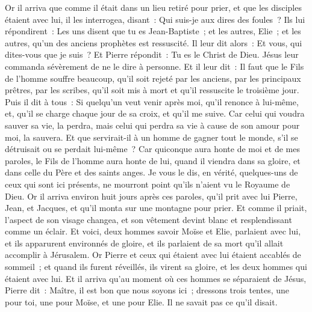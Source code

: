 \begin{multicols}{2}
Or il arriva que comme il était dans un lieu retiré pour prier, et que les disciples étaient avec lui, il les interrogea, disant~: Qui suis-je aux dires des foules~?
Ils lui répondirent~: Les uns disent que tu es Jean-Baptiste~; et les autres, Elie~; et les autres, qu'un des anciens prophètes est ressuscité.
Il leur dit alors~: Et vous, qui dites-vous que je suis~? Et Pierre répondit~: Tu es le Christ de Dieu.
Jésus leur commanda sévèrement de ne le dire à personne.
Et il leur dit~: Il faut que le Fils de l'homme souffre beaucoup, qu'il soit rejeté par les anciens, par les principaux prêtres, par les scribes, qu'il soit mis à mort et qu'il ressuscite le troisième jour.
Puis il dit à tous~: Si quelqu'un veut venir après moi, qu'il renonce à lui-même, et, qu'il se charge chaque jour de sa croix, et qu'il me suive.
Car celui qui voudra sauver sa vie, la perdra, mais celui qui perdra sa vie à cause de son amour pour moi, la sauvera.
Et que servirait-il à un homme de gagner tout le monde, s'il se détruisait ou se perdait lui-même~?
Car quiconque aura honte de moi et de mes paroles, le Fils de l'homme aura honte de lui, quand il viendra dans sa gloire, et dans celle du Père et des saints anges.
Je vous le dis, en vérité, quelques-uns de ceux qui sont ici présents, ne mourront point qu'ils n'aient vu le Royaume de Dieu.
Or il arriva environ huit jours après ces paroles, qu'il prit avec lui Pierre, Jean, et Jacques, et qu'il monta sur une montagne pour prier.
Et comme il priait, l'aspect de son visage changea, et son vêtement devint blanc et resplendissant comme un éclair.
Et voici, deux hommes savoir Moïse et Elie, parlaient avec lui,
et ils apparurent environnés de gloire, et ils parlaient de sa mort qu'il allait accomplir à Jérusalem.
Or Pierre et ceux qui étaient avec lui étaient accablés de sommeil~; et quand ils furent réveillés, ils virent sa gloire, et les deux hommes qui étaient avec lui.
Et il arriva qu'au moment où ces hommes se séparaient de Jésus, Pierre dit~: Maître, il est bon que nous soyons ici~; dressons trois tentes, une pour toi, une pour Moïse, et une pour Elie. Il ne savait pas ce qu'il disait.

\end{multicols}
